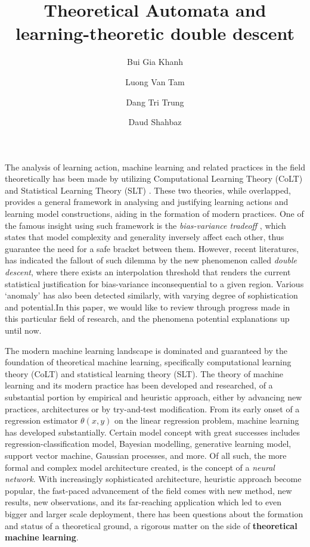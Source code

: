 \documentclass[
  journal=largetwo,
  year=2025,
  volume=37,
]{cup-journal}
\title{Theoretical Automata  and learning-theoretic double descent}
\author{Bui Gia Khanh}
\affiliation{Department of Physics, Hanoi University of Science, Vietnam National University, Hanoi Vietnam}
\author{Luong Van Tam}
\affiliation{Department of Physics, Hanoi University of Science, Vietnam National University, Hanoi Vietnam}
\author{Dang Tri Trung}
\affiliation{Monash University, Department of Computer Science, Melbourne, Australia}
\author{Daud Shahbaz}
\affiliation{COMSATS University Islamabad, Islamabad, Pakistan}
\begin{document}
\clearpage

The analysis of learning action, machine learning and related practices in the field theoretically has been made by utilizing Computational Learning Theory (CoLT) \cite{10.1145/1968.1972} and Statistical Learning Theory (SLT) \cite{Vapnik1999-VAPTNO}. These two theories, while overlapped, provides a general framework in analysing and justifying learning actions and learning model constructions, aiding in the formation of modern practices. One of the famous insight using such framework is the \textit{bias-variance tradeoff} \cite{6797087}, which states that model complexity and generality inversely affect each other, thus guarantee the need for a safe bracket between them. However, recent literatures, \cite{belkin_reconciling_2019} has indicated the fallout of such dilemma by the new phenomenon called \textit{double descent}, where there exists an interpolation threshold that renders the current statistical justification for bias-variance inconsequential to a given region. Various `anomaly' has also been detected similarly, with varying degree of sophistication and potential.In this paper, we would like to review through progress made in this particular field of research, and the phenomena potential explanations up until now. 

The modern machine learning landscape is dominated and guaranteed by the foundation of theoretical machine learning, specifically computational learning theory (CoLT) and statistical learning theory (SLT). The theory of machine learning and its modern practice has been developed and researched, of a substantial portion by empirical and heuristic approach, either by advancing new practices, architectures or by try-and-test modification. From its early onset of a regression estimator $\theta(x,y)$ on the linear regression problem, machine learning has developed substantially. Certain model concept with great successes includes regression-classification model, Bayesian modelling, generative learning model, support vector machine, Gaussian processes, and more. Of all such, the more formal and complex model architecture created, is the concept of a \textit{neural network}. With increasingly sophisticated architecture, heuristic approach become popular, the fast-paced advancement of the field comes with new method, new results, new observations, and its far-reaching application which led to even bigger and larger scale deployment, there has been questions about the formation and status of a theoretical ground, a rigorous matter on the side of \textbf{theoretical machine learning}.
\end{document}
